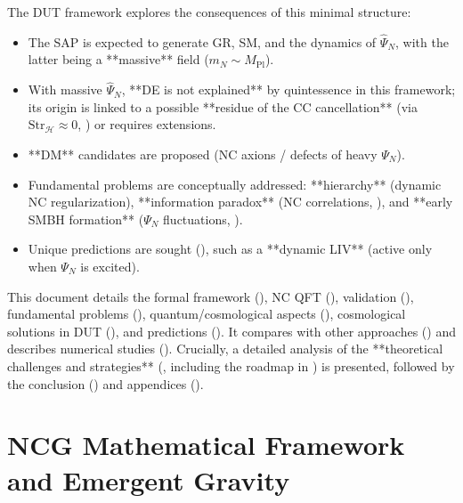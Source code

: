 \documentclass[11pt, a4paper]{article}
\theoremstyle{remark}
\newcommand{\Op}[1]{\hat{#1}}
\newcommand{\Str}{\mathrm{Str}}
\newcommand{\Mpl}{M_{\mathrm{Pl}}}
\begin{document}
The DUT framework explores the consequences of this minimal structure:
\begin{itemize}[label=\textbullet, wide, labelwidth=!, labelindent=0pt]
    \item The SAP is expected to generate GR, SM, and the dynamics of \( \Op{\Psi}_N \), with the latter being a **massive** field (\( m_N \sim \Mpl \)).
    \item With massive \( \Op{\Psi}_N \), **DE is not explained** by quintessence in this framework; its origin is linked to a possible **residue of the CC cancellation** (via \( \Str_{\mathcal{H}} \approx 0 \), ) or requires extensions.
    \item **DM** candidates are proposed (NC axions / defects of heavy \( \Psi_N \)).
    \item Fundamental problems are conceptually addressed: **hierarchy** (dynamic NC regularization), **information paradox** (NC correlations, ), and **early SMBH formation** (\( \Psi_N \) fluctuations, ).
    \item Unique predictions are sought (), such as a **dynamic LIV** (active only when \( \Psi_N \) is excited).
\end{itemize}

This document details the formal framework (), NC QFT (), validation (), fundamental problems (), quantum/cosmological aspects (), cosmological solutions in DUT (), and predictions (). It compares with other approaches () and describes numerical studies (). Crucially, a detailed analysis of the **theoretical challenges and strategies** (, including the roadmap in ) is presented, followed by the conclusion () and appendices ().

\section{NCG Mathematical Framework and Emergent Gravity}
\label{sec:gnc_framework_final}
\end{document}
